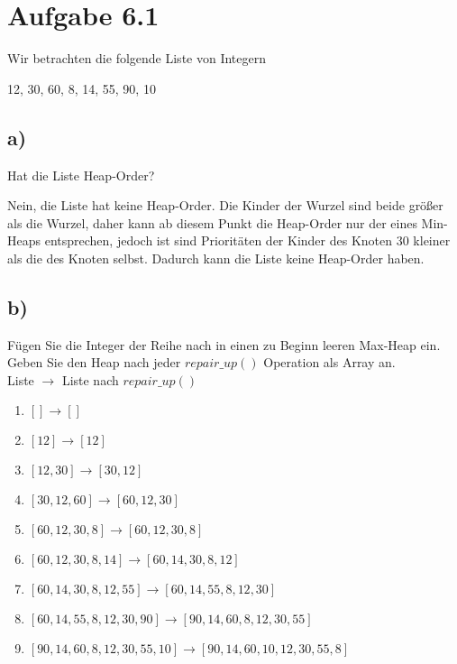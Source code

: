 \documentclass[a4paper]{article}
\begin{document}
\section*{Aufgabe 6.1}
Wir betrachten die folgende Liste von Integern
\begin{center}
    12, 30, 60, 8, 14, 55, 90, 10
\end{center}
\subsection*{a)}
Hat die Liste Heap-Order?


Nein, die Liste hat keine Heap-Order. Die Kinder der Wurzel sind beide größer als die Wurzel, daher kann ab diesem Punkt die Heap-Order nur der eines Min-Heaps entsprechen, jedoch ist sind Prioritäten der Kinder des Knoten $30$ kleiner als die des Knoten selbst. Dadurch kann die Liste keine Heap-Order haben.


\subsection*{b)}
Fügen Sie die Integer der Reihe nach in einen zu Beginn leeren Max-Heap ein. Geben Sie den
Heap nach jeder $repair\_up()$ Operation als Array an.\\

Liste $\rightarrow$ Liste nach $repair\_up()$
\begin{enumerate}
    \item $[] \rightarrow []$
    \item $[12] \rightarrow [12]$
    \item $[12, 30] \rightarrow [30, 12]$
    \item $[30, 12, 60] \rightarrow [60, 12, 30]$
    \item $[60, 12, 30, 8] \rightarrow [60, 12, 30, 8]$
    \item $[60, 12, 30, 8, 14] \rightarrow [60, 14, 30, 8, 12]$
    \item $[60, 14, 30, 8, 12, 55] \rightarrow [60, 14, 55, 8, 12, 30]$
    \item $[60, 14, 55, 8, 12, 30, 90] \rightarrow [90, 14, 60, 8, 12, 30, 55]$
    \item $[90, 14, 60, 8, 12, 30, 55, 10] \rightarrow [90, 14, 60, 10, 12, 30, 55, 8]$
\end{enumerate}
\end{document}
